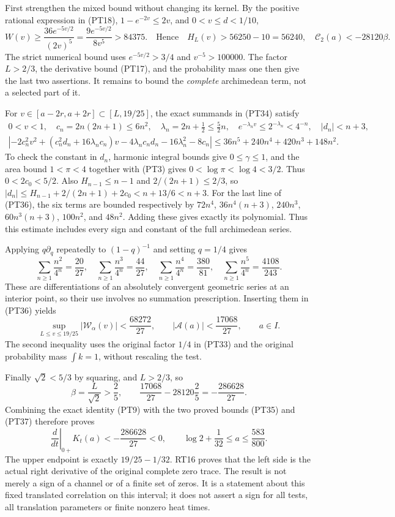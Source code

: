 \documentclass[
  10pt,
  a4paper,
]{article}
\begin{document}
First strengthen the mixed bound without changing its kernel. By the
positive rational expression in (PT18), \(1-e^{-2v}\le2v\), and
\(0<v\le d<1/10\), \[
W(v)\ge\frac{36e^{-5v/2}}{(2v)^5}
=\frac{9e^{-5v/2}}{8v^5}>84375.
\quad\text{Hence}\quad
H_L(v)>56250-10=56240,
\quad\boxed{\mathcal C_2(a)<-28120\beta.}
\tag{PT35}
\] The strict numerical bound uses \(e^{-5v/2}>3/4\) and
\(v^{-5}>100000\). The factor \(L>2/3\), the derivative bound (PT17),
and the probability mass one then give the last two assertions. It
remains to bound the \emph{complete} archimedean term, not a selected
part of it.

For \(v\in[a-2r,a+2r]\subset[L,19/25]\), the exact summands in (PT34)
satisfy \[
\begin{gathered}
0<v<1,\quad c_n=2n(2n+1)\le6n^2,\quad
\lambda_n=2n+\tfrac12\le\tfrac52n,\quad
e^{-\lambda_nv}\le2^{-\lambda_n}<4^{-n},\quad |d_n|<n+3,\\
\left|-2c_n^2v^2+(c_n^2d_n+16\lambda_nc_n)v
-4\lambda_nc_nd_n-16\lambda_n^2-8c_n\right|
\le36n^5+240n^4+420n^3+148n^2.
\end{gathered}
\tag{PT36}
\] To check the constant in \(d_n\), harmonic integral bounds give
\(0\le\gamma\le1\), and the area bound \(1<\pi<4\) together with (PT3)
gives \(0<\log\pi<\log4<3/2\). Thus \(0<2c_0<5/2\). Also
\(H_{n-1}\le n-1\) and \(2/(2n+1)\le2/3\), so
\(|d_n|\le H_{n-1}+2/(2n+1)+2c_0<n+13/6<n+3\). For the last line of
(PT36), the six terms are bounded respectively by \(72n^4\),
\(36n^4(n+3)\), \(240n^3\), \(60n^3(n+3)\), \(100n^2\), and \(48n^2\).
Adding these gives exactly its polynomial. Thus this estimate includes
every sign and constant of the full archimedean series.

Applying \(q\partial_q\) repeatedly to \((1-q)^{-1}\) and setting
\(q=1/4\) gives \[
\sum_{n\ge1}\frac{n^2}{4^n}=\frac{20}{27},\quad
\sum_{n\ge1}\frac{n^3}{4^n}=\frac{44}{27},\quad
\sum_{n\ge1}\frac{n^4}{4^n}=\frac{380}{81},\quad
\sum_{n\ge1}\frac{n^5}{4^n}=\frac{4108}{243}.
\] These are differentiations of an absolutely convergent geometric
series at an interior point, so their use involves no summation
prescription. Inserting them in (PT36) yields \[
\sup_{L\le v\le19/25}|\mathcal W_\alpha(v)|
<\frac{68272}{27},\qquad
\boxed{|\mathcal A(a)|<\frac{17068}{27},\qquad a\in I.}
\tag{PT37}
\] The second inequality uses the original factor \(1/4\) in (PT33) and
the original probability mass \(\int k=1\), without rescaling the test.

Finally \(\sqrt2<5/3\) by squaring, and \(L>2/3\), so \[
\beta=\frac{L}{\sqrt2}>\frac25,\qquad
\frac{17068}{27}-28120\frac25=-\frac{286628}{27}.
\tag{PT38}
\] Combining the exact identity (PT9) with the two proved bounds (PT35)
and (PT37) therefore proves \[
\boxed{
\left.\frac{d}{dt}\right|_{0+}K_t(a)
<-\frac{286628}{27}<0,
\qquad
\log2+\frac1{32}\le a\le\frac{583}{800}.}
\tag{PT39}
\] The upper endpoint is exactly \(19/25-1/32\). RT16 proves that the
left side is the actual right derivative of the original complete zero
trace. The result is not merely a sign of a channel or of a finite set
of zeros. It is a statement about this fixed translated correlation on
this interval; it does not assert a sign for all tests, all translation
parameters or finite nonzero heat times.
\end{document}
